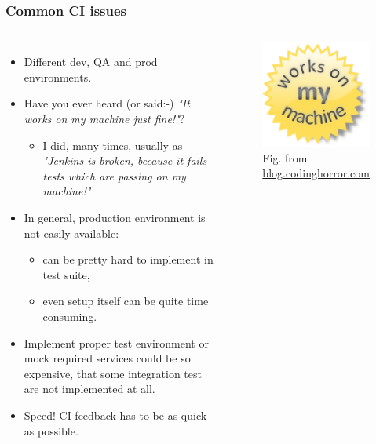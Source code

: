 \documentclass[10pt,utf8]{beamer}
\begin{document}
\begin{frame}
	\frametitle{Common CI issues}
	\begin{columns}
		\begin{itemize}
			\item Different dev, QA and prod environments. 
			\item Have you ever heard (or said:-) \textit{"It works on my machine just fine!"}?
			\begin{itemize}
				\item I did, many times, usually as \textit{"Jenkins is broken, because it fails tests which are passing on my machine!"}
			\end{itemize}
			\item In general, production environment is not easily available:
			\begin{itemize}
				\item can be pretty hard to implement in test suite,
				\item even setup itself can be quite time consuming.
			\end{itemize}
			\item Implement proper test environment or mock required services could be so expensive, that some integration test are not implemented at all.
			\item Speed! CI feedback has to be as quick as possible.
		\end{itemize}
		
		\begin{figure}
			\centering
			\includegraphics[width=4cm]{./img/works_on_my_machine.eps}
			\caption{\tiny{Fig. from \href{http://blog.codinghorror.com/the-works-on-my-machine-certification-program/}{blog.codinghorror.com}}}
		\end{figure}
	\end{columns}
\end{frame}
\end{document}
